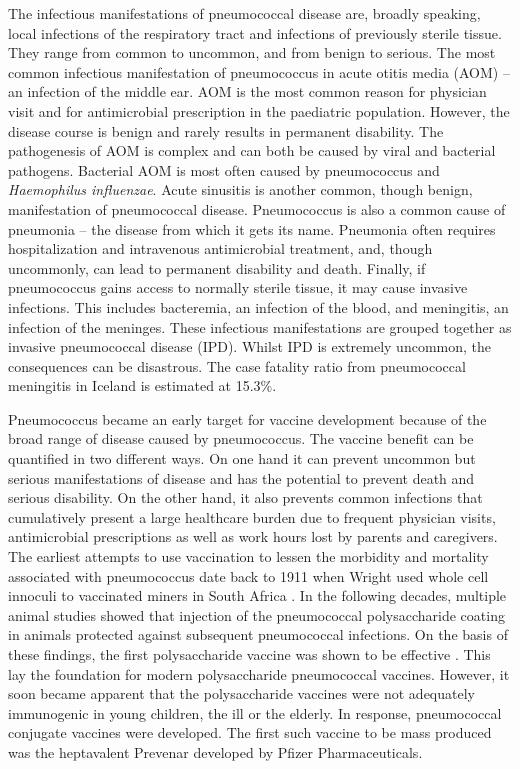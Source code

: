\documentclass[]{book}
\theoremstyle{definition}
\theoremstyle{definition}
\theoremstyle{definition}
\theoremstyle{remark}
\begin{document}
The infectious manifestations of pneumococcal disease are, broadly
speaking, local infections of the respiratory tract and infections of
previously sterile tissue. They range from common to uncommon, and from
benign to serious. The most common infectious manifestation of
pneumococcus in acute otitis media (AOM) -- an infection of the middle
ear. AOM is the most common reason for physician visit and for
antimicrobial prescription in the paediatric population. However, the
disease course is benign and rarely results in permanent disability. The
pathogenesis of AOM is complex and can both be caused by viral and
bacterial pathogens. Bacterial AOM is most often caused by pneumococcus
and \emph{Haemophilus influenzae}. Acute sinusitis is another common,
though benign, manifestation of pneumococcal disease. Pneumococcus is
also a common cause of pneumonia -- the disease from which it gets its
name. Pneumonia often requires hospitalization and intravenous
antimicrobial treatment, and, though uncommonly, can lead to permanent
disability and death. Finally, if pneumococcus gains access to normally
sterile tissue, it may cause invasive infections. This includes
bacteremia, an infection of the blood, and meningitis, an infection of
the meninges. These infectious manifestations are grouped together as
invasive pneumococcal disease (IPD). Whilst IPD is extremely uncommon,
the consequences can be disastrous. The case fatality ratio from
pneumococcal meningitis in Iceland is estimated at 15.3\%.

Pneumococcus became an early target for vaccine development because of
the broad range of disease caused by pneumococcus. The vaccine benefit
can be quantified in two different ways. On one hand it can prevent
uncommon but serious manifestations of disease and has the potential to
prevent death and serious disability. On the other hand, it also
prevents common infections that cumulatively present a large healthcare
burden due to frequent physician visits, antimicrobial prescriptions as
well as work hours lost by parents and caregivers. The earliest attempts
to use vaccination to lessen the morbidity and mortality associated with
pneumococcus date back to 1911 when Wright used whole cell innoculi to
vaccinated miners in South Africa \citep{Wright1914}. In the following
decades, multiple animal studies showed that injection of the
pneumococcal polysaccharide coating in animals protected against
subsequent pneumococcal infections. On the basis of these findings, the
first polysaccharide vaccine was shown to be effective
\citep{Macleod1945}. This lay the foundation for modern polysaccharide
pneumococcal vaccines. However, it soon became apparent that the
polysaccharide vaccines were not adequately immunogenic in young
children, the ill or the elderly. In response, pneumococcal conjugate
vaccines were developed. The first such vaccine to be mass produced was
the heptavalent Prevenar developed by Pfizer Pharmaceuticals.
\end{document}
